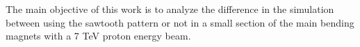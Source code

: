 The main objective of this work is to analyze the difference in the simulation between using the sawtooth pattern or not in a small section of the main bending magnets with a 7 TeV proton energy beam. 


